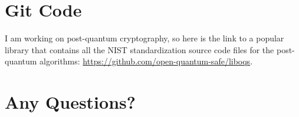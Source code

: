 \section{Git Code}
I am working on post-quantum cryptography, so here is the link to a popular library that contains all the NIST standardization source code files for the post-quantum algorithms:
\href{https://github.com/open-quantum-safe/liboqs}{https://github.com/open-quantum-safe/liboqs}.

\section{Any Questions?}
%
%
